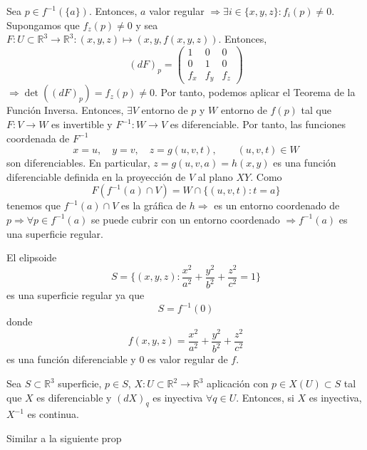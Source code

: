 \begin{dem}
  Sea $p \in f^{-1}(\{ a \})$. Entonces, $a$ valor regular $\Rightarrow \exists i \in \{ x, y, z \} : f_{i}(p) \neq 0$. Supongamos que $f_{z}(p) \neq 0$ y sea $F : U \subset \mathbb{R}^{3} \to \mathbb{R}^{3}: (x, y, z) \mapsto (x, y, f(x, y, z))$. Entonces,
  \[
    (d F)_{p} = 
    \begin{pmatrix}
       1 & 0 & 0\\
       0 & 1 & 0\\
       f_{x} & f_{y} & f_{z}
    \end{pmatrix}
  \]
  $\Rightarrow \det ( (d F)_{p}) = f_{z}(p) \neq 0$. Por tanto, podemos aplicar el Teorema de la Función Inversa. Entonces, $\exists V$ entorno de $p$ y $W$ entorno de $f(p)$ tal que $F : V \to W$ es invertible y $F^{-1} : W \to V$ es diferenciable. Por tanto, las funciones coordenada de $F^{-1}$
  \[ 
    x = u, \quad y = v, \quad z = g(u, v, t), \qquad (u, v, t) \in W
  \] 
  son diferenciables. En particular, $z = g(u, v, a) = h(x, y)$ es una función diferenciable definida en la proyección de $V$ al plano $XY$. Como
  \[ 
    F(f^{-1}(a) \cap V) = W \cap \{ (u, v, t) : t = a \}  
  \] 
  tenemos que $f^{-1}(a) \cap V$ es la gráfica de $h \Rightarrow$ es un entorno coordenado de $p \Rightarrow \forall p \in f^{-1}(a)$ se puede cubrir con un entorno coordenado $\Rightarrow f^{-1}(a)$ es una superficie regular. 
\end{dem}

\begin{ejm}
  El elipsoide 
  \[ 
    S = \Big \{ (x,y,z) : \frac{x^{2}}{a^{2}} + \frac{y^{2}}{b ^{2}} + \frac{z^{2}}{c^{2}} = 1
 \Big\}
  \] 
  es una superficie regular ya que 
  \[ 
    S = f^{-1}(0) 
  \] 
  donde
  \[ 
    f(x,y,z) = \frac{x^{2}}{a^{2}} + \frac{y^{2}}{b ^{2}} + \frac{z^{2}}{c^{2}} 
  \] 
  es una función diferenciable y $0$ es valor regular de $f$.
\end{ejm}

\begin{prop}
  Sea $S \subset \mathbb{R}^{3}$ superficie, $p \in S$, $X: U \subset \mathbb{R}^{2} \to \mathbb{R}^{3}$ aplicación con $p \in X(U) \subset S$ tal que $X$ es diferenciable y $(dX)_{q}$ es inyectiva $\forall q \in U$. Entonces, si $X$ es inyectiva, $X^{-1}$ es continua.
\end{prop}

\begin{dem}
  Similar a la siguiente prop
\end{dem}

